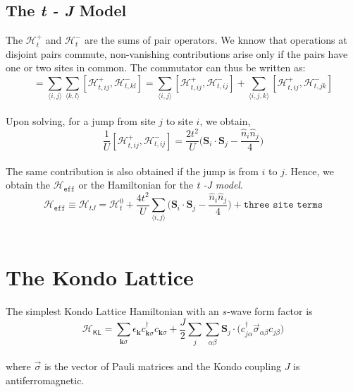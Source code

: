 \documentclass{article}
\begin{document}
\subsection{The \textit{t - J} Model}
The $\mathcal{H}_{t}^{+}$ and $\mathcal{H}_{t}^{-}$ are the sums of pair operators. We knnow that operations at disjoint pairs commute, non-vanishing contributions arise only if the pairs have one or two sites in common. The commutator can thus be written as:
\\
\begin{equation}
[\mathcal{H}_{t}^{+}, \mathcal{H}_{t}^{-}] = \sum_{\langle i,j \rangle}\sum_{\langle k, l \rangle} [\mathcal{H}_{t, ij}^{+}, \mathcal{H}_{t, kl}^{-}] =    \sum_{\langle i,j \rangle} [\mathcal{H}_{t, ij}^{+}, \mathcal{H}_{t, ij}^{-}] + \sum_{\langle i,j,k \rangle} [\mathcal{H}_{t, ij}^{+}, \mathcal{H}_{t, jk}^{-}]
\end{equation}
\\
Upon solving, for a jump from site $j$ to site $i$, we obtain,
\\
\begin{equation}
\frac{1}{U} [\mathcal{H}_{t, ij}^{+}, \mathcal{H}_{t, ij}^{-}] = \frac{2t^2}{U} \Big(\textbf{S}_i \cdot \textbf{S}_j - \frac{\hat{n}_i \hat{n}_j}{4} \Big)
\end{equation} 
\\
The same contribution is also obtained if the jump is from  $i$ to $j$. Hence, we obtain the $\mathcal{H}_{\texttt{eff}}$ or the Hamiltonian for the \textit{t -J model}.
\\
\begin{equation}
\mathcal{H}_{\texttt{eff}} \equiv \mathcal{H}_{tJ} = \mathcal{H}_t^0 +  \frac{4t^2}{U}\sum_{\langle i,j \rangle} \Big(\textbf{S}_i \cdot \textbf{S}_j - \frac{\hat{n}_i \hat{n}_j}{4} \Big) + \texttt{three site terms}
\end{equation}
\\

\section{The Kondo Lattice}


The simplest Kondo Lattice Hamiltonian with an $s$-wave form factor is 
\\
\begin{equation}
\mathcal{H}_{\textsf{KL}} = \sum_{\textbf{k}\sigma} \epsilon_{\textbf{k}} c_{\textbf{k}\sigma}^\dagger c_{\textbf{k}\sigma} + \frac{J}{2} \sum_{j}\sum_{\alpha \beta} \textbf{S}_{j} \cdot \big(c_{j\alpha}^\dagger \vec{\sigma}_{\alpha \beta} c_{j\beta}\big)
\end{equation}
\\
where $\vec{\sigma}$ is the vector of Pauli matrices and the Kondo coupling $J$ is antiferromagnetic. 
\end{document}
